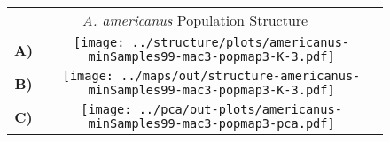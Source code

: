 \documentclass[border=10pt,varwidth=30cm]{standalone}
\begin{document}
\begin{figure}
\begin{tabular}[t]{cc}
    \multicolumn{2}{c}{\Large \textit{A. americanus} Population Structure} \\
  {\textbf{\large A)}} & \texttt{[image: ../structure/plots/americanus-minSamples99-mac3-popmap3-K-3.pdf]} \\ \vspace{1mm}
  {\textbf{\large B)}} & \texttt{[image: ../maps/out/structure-americanus-minSamples99-mac3-popmap3-K-3.pdf]} \\
  {\textbf{\large C)}} & \texttt{[image: ../pca/out-plots/americanus-minSamples99-mac3-popmap3-pca.pdf]} \\
\end{tabular}
\end{figure}
\end{document}

